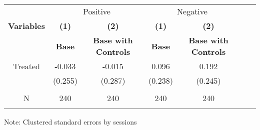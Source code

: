  \begin{table}[htbp]
    \begin{tabular}{c c c c c c c }
    \toprule
    &\multicolumn{2}{c}{Positive}         &\multicolumn{2}{c}{Negative}      \\

    \textbf{Variables} & \textbf{(1)} & \textbf{(2)}  & \textbf{(1)} & \textbf{(2)}              \\ 

    \textbf & \textbf{ Base } & \textbf{Base with Controls}  & \textbf{ Base } & \textbf{Base with Controls}  \\ 

    \midrule
     Treated           & -0.033      & -0.015      & 0.096      & 0.192  \\
                       & (0.255)     & (0.287)     & (0.238)    & (0.245)   \\
                       &             &             &            &                  \\

    \midrule
     N                  &   240          &      240  &     240  &     240        \\          
    \bottomrule
    \addlinespace[1ex]
    \multicolumn{3}{l}{\textsuperscript{***}$p<0.01$, 
      \textsuperscript{**}$p<0.05$, 
      \textsuperscript{*}$p<0.1$}
    \end{tabular}
    \newline
    Note: Clustered standard errors by sessions
\end{table}
